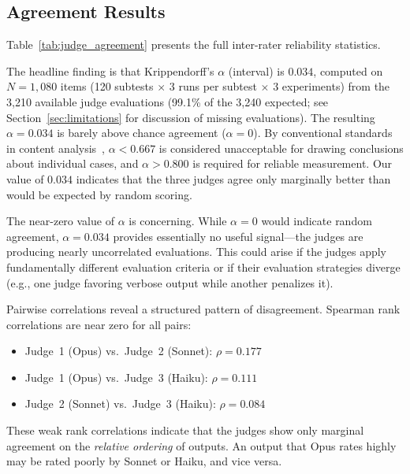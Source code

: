 \documentclass[11pt]{article}
\begin{document}
\subsection{Agreement Results}
\label{sec:agreement_results}

Table~\ref{tab:judge_agreement} presents the full inter-rater reliability
statistics.



The headline finding is that Krippendorff's $\alpha$ (interval) is $0.034$,
computed on $N=1{,}080$ items (120 subtests $\times$ 3 runs per subtest
$\times$ 3 experiments) from the 3,210 available judge evaluations
(99.1\% of the 3,240 expected; see Section~\ref{sec:limitations} for
discussion of missing evaluations).
The resulting $\alpha = 0.034$ is barely above chance agreement ($\alpha = 0$). By conventional
standards in content analysis~\cite{krippendorff2004content, polo2024efficient}, $\alpha < 0.667$ is
considered
unacceptable for drawing conclusions about individual cases, and
$\alpha > 0.800$ is required for reliable measurement. Our value of $0.034$
indicates that the three judges agree only marginally better than would be
expected by random scoring.

The near-zero value of $\alpha$ is concerning. While $\alpha = 0$
would indicate random agreement, $\alpha = 0.034$ provides essentially no
useful signal---the judges are producing nearly uncorrelated evaluations.
This could arise if the judges apply fundamentally different evaluation
criteria or if their evaluation strategies diverge (e.g., one judge favoring
verbose output while another penalizes it).

Pairwise correlations reveal a structured pattern of disagreement. Spearman
rank correlations are near zero for all pairs:

\begin{itemize}
  \item Judge~1 (Opus) vs.\ Judge~2 (Sonnet): $\rho = 0.177$
  \item Judge~1 (Opus) vs.\ Judge~3 (Haiku): $\rho = 0.111$
  \item Judge~2 (Sonnet) vs.\ Judge~3 (Haiku): $\rho = 0.084$
\end{itemize}

These weak rank correlations indicate that the judges show only marginal
agreement on the \emph{relative ordering} of outputs. An output that Opus
rates highly may be rated poorly by Sonnet or Haiku, and vice versa.
\end{document}
